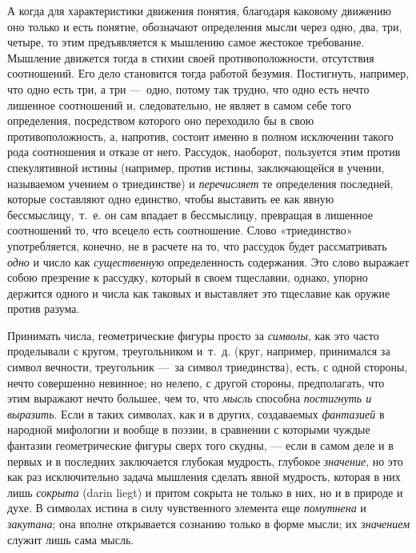 {А когда для характеристики движения понятия, благодаря каковому движению оно
только и есть понятие, обозначают определения мысли через одно, два, три,
четыре, то этим предъявляется к мышлению самое жестокое требование.
Мышление движется тогда в стихии своей противоположности, отсутствия
соотношений. Его дело становится тогда работой безумия. Постигнуть,
например, что одно есть три, а три —~одно, потому так трудно, что одно есть
нечто лишенное соотношений и, следовательно, не являет в самом себе того
определения, посредством которого оно переходило бы в свою
противоположность, а, напротив, состоит именно в полном исключении такого
рода соотношения и отказе от него. Рассудок, наоборот, пользуется этим
против спекулятивной истины (например, против истины, заключающейся в
учении, называемом учением о триединстве) и
{\em перечисляет} те определения последней, которые
составляют одно единство, чтобы выставить ее как явную бессмыслицу,~т.~е.
он сам впадает в бессмыслицу, превращая в лишенное соотношений то, что
всецело есть соотношение. Слово «триединство» употребляется, конечно, не в
расчете на то, что рассудок будет рассматривать
{\em одно} и число как
{\em существенную} определенность содержания. Это слово
выражает собою презрение к рассудку, который в своем тщеславии, однако,
упорно держится одного и числа как таковых и выставляет это тщеславие как
оружие против разума.

Принимать числа, геометрические фигуры просто за
{\em символы}, как это часто проделывали с кругом,
треугольником и~т.~д. (круг, например, принимался за символ вечности,
треугольник —~за символ триединства), есть, с одной стороны, нечто
совершенно невинное; но нелепо, с другой стороны, предполагать, что этим
выражают нечто большее, чем то, что {\em мысль}
способна {\em постигнуть и выразить}. Если в таких
символах, как и в других, создаваемых {\em фантазией} в
народной мифологии и вообще в поэзии, в сравнении с которыми чуждые
фантазии геометрические фигуры сверх того скудны, — если в самом деле и в
первых и в последних заключается глубокая мудрость, глубокое
{\em значение}, но это как раз исключительно задача
мышления сделать явной мудрость, которая в них лишь
{\em сокрыта} (darin liegt) и притом сокрыта не только
в них, но и в природе и духе. В символах истина в силу чувственного
элемента еще {\em помутнена} и
{\em закутана}; она вполне открывается сознанию только
в форме мысли; их {\em значением} служит лишь сама
мысль.

}
